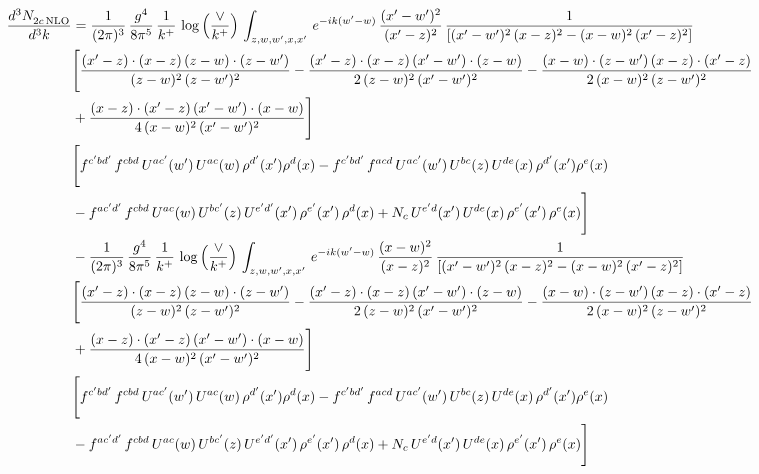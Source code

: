 \documentclass[9pt]{article}
\numberwithin{equation}{section}
\begin{document}
\begin{align}
    \frac{d^{3}N_{2c\,\rm NLO}^{\rm}}{d^{3}k}  & =  \frac{1}{(2\pi)^{3}}\, \frac{g^{4}}{8\pi^{5}}\,\frac{1}{k^{+}}\,\log{\left(\frac{\vee}{k^{+}}\right)} \,\int_{z,w,w^{\prime},x,x'}\, e^{-ik(w^{\prime}-w)}\,\frac{(x'-w')^{2}}{(x'-z)^{2}}\, \frac{1}{\left[(x'-w')^{2}\, (x-z)^{2} - (x-w)^{2}\, (x'-z)^{2}\right]} \notag \\ & \Bigg[\frac{(x'-z)\cdot (x-z)\, (z-w)\cdot (z-w')}{(z-w)^{2}\, (z-w')^{2}}-\frac{(x'-z)\cdot (x-z)\, (x'-w')\cdot (z-w)}{2\, (z-w)^{2}\, (x'-w')^{2}} -\frac{(x-w)\cdot (z-w')\, (x-z)\cdot (x'-z)}{2\, (x-w)^{2}\, (z-w')^{2}}\notag \\ & +\frac{(x-z)\cdot (x'-z)\, (x'-w')\cdot (x-w)}{4\, (x-w)^{2}\, (x'-w')^{2}}\Bigg]\notag \\ &  \Bigg[f^{c'bd'}\,f^{cbd}\, U^{ac'}(w')\,U^{ac}(w)\,\rho^{d'}(x')\rho^{d}(x)- f^{c'bd'}\,f^{acd}\,U^{ac'}(w')\,U^{bc}(z)\,U^{de}(x)\,\rho^{d'}(x')\rho^{e}(x) \notag \\ & -f^{ac'd'}\,f^{cbd}\,U^{ac}(w)\,U^{bc'}(z)\,U^{e'd'}(x')\,\rho^{e'}(x')\,\rho^{d}(x) +N_{c}\,U^{e'd}(x')\,U^{de}(x)\,\rho^{e'}(x')\,\rho^{e}(x)\Bigg] \notag \\
& -\frac{1}{(2\pi)^{3}}\, \frac{g^{4}}{8\pi^{5}}\,\frac{1}{k^{+}}\,\log{\left(\frac{\vee}{k^{+}}\right)}\,\int_{z,w,w^{\prime},x,x'}\, e^{-ik(w^{\prime}-w)}\,\frac{(x-w)^{2}}{(x-z)^{2}}\, \frac{1}{\left[(x'-w')^{2}\, (x-z)^{2} - (x-w)^{2}\, (x'-z)^{2}\right]} \notag \\ & \Bigg[\frac{(x'-z)\cdot (x-z)\, (z-w)\cdot (z-w')}{(z-w)^{2}\, (z-w')^{2}}-\frac{(x'-z)\cdot (x-z)\, (x'-w')\cdot (z-w)}{2\, (z-w)^{2}\, (x'-w')^{2}} -\frac{(x-w)\cdot (z-w')\, (x-z)\cdot (x'-z)}{2\, (x-w)^{2}\, (z-w')^{2}}\notag \\ & +\frac{(x-z)\cdot (x'-z)\, (x'-w')\cdot (x-w)}{4\, (x-w)^{2}\, (x'-w')^{2}}\Bigg] \notag \\ &  \Bigg[f^{c'bd'}\,f^{cbd}\, U^{ac'}(w')\,U^{ac}(w)\,\rho^{d'}(x')\rho^{d}(x)- f^{c'bd'}\,f^{acd}\,U^{ac'}(w')\,U^{bc}(z)\,U^{de}(x)\,\rho^{d'}(x')\rho^{e}(x) \notag \\ & -f^{ac'd'}\,f^{cbd}\,U^{ac}(w)\,U^{bc'}(z)\,U^{e'd'}(x')\,\rho^{e'}(x')\,\rho^{d}(x) +N_{c}\,U^{e'd}(x')\,U^{de}(x)\,\rho^{e'}(x')\,\rho^{e}(x)\Bigg]
\end{align}
\end{document}
